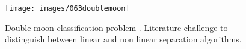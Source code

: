 \begin{figure}[!h]
\centering
\texttt{[image: images/063doublemoon]}
\caption[Double moon classification problem 1]{Double moon classification
problem \cite{RefWorks:158}. Literature challenge to distinguish between linear
and non linear separation algorithms.}
\label{fig:063doublemoon}
\end{figure}